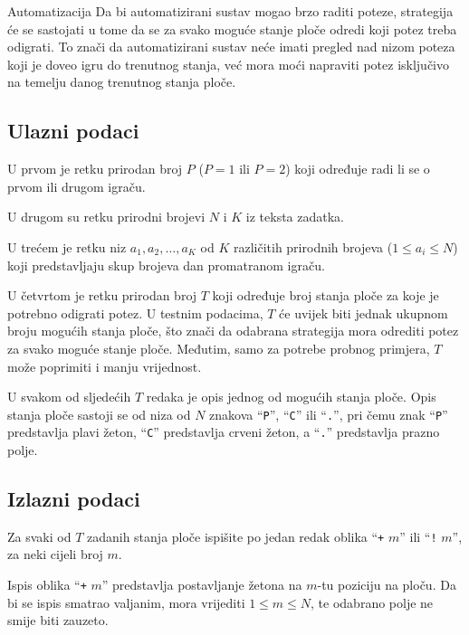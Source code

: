 \begin{statement}[
  problempoints=100,
  timelimit=1 sekunda,
  memorylimit=512 MiB,
]{Automatizacija}
Da bi automatizirani sustav mogao brzo raditi poteze,  
strategija će se sastojati u tome da se za svako moguće stanje 
ploče odredi koji potez treba odigrati. 
To znači da automatizirani sustav neće imati pregled nad nizom poteza
koji je doveo igru do trenutnog stanja, 
već mora moći napraviti potez isključivo na temelju danog trenutnog stanja ploče.  

\subsection*{Ulazni podaci}

U prvom je retku prirodan broj $P$ ($P=1$ ili $P=2$) koji određuje 
radi li se o prvom ili drugom igraču. 

U drugom su retku prirodni brojevi $N$ i $K$ iz teksta zadatka. 

U trećem je retku niz $a_1, a_2, \dots, a_K$ od $K$ različitih 
prirodnih brojeva ($1 \leq a_i \leq N$) 
koji predstavljaju skup brojeva dan promatranom igraču. 

U četvrtom je retku prirodan broj $T$ koji određuje broj stanja ploče za koje je 
potrebno odigrati potez. 
U testnim podacima, $T$ će uvijek biti jednak ukupnom broju mogućih stanja ploče, 
što znači da odabrana strategija mora odrediti potez za svako moguće stanje ploče. 
Međutim, samo za potrebe probnog primjera, $T$ može poprimiti i manju vrijednost. 

U svakom od sljedećih $T$ redaka je opis jednog od mogućih stanja ploče. 
Opis stanja ploče sastoji se od niza od $N$ znakova “\texttt{P}”, “\texttt{C}” ili “\texttt{.}”, 
pri čemu znak “\texttt{P}” predstavlja plavi žeton, “\texttt{C}” predstavlja crveni žeton, 
a “\texttt{.}” predstavlja prazno polje.  

\subsection*{Izlazni podaci}

Za svaki od $T$ zadanih stanja ploče ispišite 
po jedan redak oblika “\texttt{+} $m$” ili “\texttt{!} $m$”, za neki cijeli broj $m$. 
\vspace{-0.15em}

Ispis oblika “\texttt{+} $m$” predstavlja postavljanje žetona 
na $m$-tu poziciju na ploču.
Da bi se ispis smatrao valjanim, mora vrijediti $1 \leq m \leq N$, 
te odabrano polje ne smije biti zauzeto. 


\end{statement}
